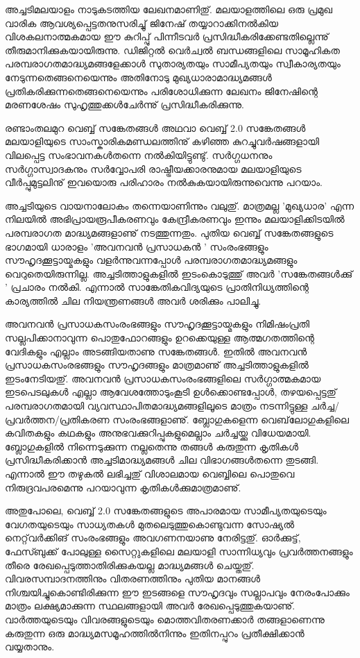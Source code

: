 ﻿
\vskip 2pt

\hspace*{2em}\parbox{8.5cm}{
\small
അച്ചടിമലയാളം നാടുകടത്തിയ ലേഖനമാണിതു്. മലയാളത്തിലെ ഒരു പ്രമുഖ വാരിക ആവശ്യപ്പെട്ടതനുസരിച്ചു് ജിനേഷ് 
തയ്യാറാക്കിനല്‍കിയ വിശകലനാത്മകമായ ഈ കുറിപ്പു് പിന്നീടവര്‍ പ്രസിദ്ധീകരിക്കേണ്ടതില്ലെന്നു് തീരുമാനിക്കുകയായിരുന്നു.
 ഡിജിറ്റല്‍ വെര്‍ച്വല്‍ ബന്ധങ്ങളിലെ സാമൂഹികത പരമ്പരാഗതമാദ്ധ്യമങ്ങളേക്കാള്‍ സുതാര്യതയും സാമീപ്യതയും സ്വീകാര്യതയും 
നേടുന്നതെങ്ങനെയെന്നും അതിനോടു മുഖ്യധാരാമാദ്ധ്യമങ്ങള്‍ പ്രതികരിക്കുന്നതെങ്ങനെയെന്നും പരിശോധിക്കുന്ന ലേഖനം 
ജിനേഷിന്റെ മരണശേഷം സുഹൃത്തുക്കള്‍ചേര്‍ന്നു് പ്രസിദ്ധീകരിക്കുന്നു.
}

\vskip 12pt
\hspace*{-1.5em}രണ്ടാംതലമുറ വെബ്ബ് സങ്കേതങ്ങള്‍ അഥവാ വെബ്ബ് 2.0 സങ്കേതങ്ങള്‍ മലയാളിയുടെ സാംസ്കാരികമണ്ഡലത്തിനു് 
കഴിഞ്ഞ കുറച്ചുവര്‍ഷങ്ങളായി വിലപ്പെട്ട സംഭാവനകള്‍തന്നെ നല്‍കിയിട്ടുണ്ടു്. സര്‍ഗ്ഗധനനും സര്‍ഗ്ഗാസ്വാദകനും സര്‍വ്വോപരി രാഷ്ട്രീയക്കാരനുമായ 
മലയാളിയുടെ വീര്‍പ്പുമുട്ടലിനു് ഇവയൊരു പരിഹാരം നല്‍കുകയായിരുന്നുവെന്നു പറയാം.

അച്ചടിയുടെ വായനാലോകം തന്നെയാണിന്നും വലുതു്. മാത്രമല്ല 'മുഖ്യധാര' എന്ന നിലയില്‍ അഭിപ്രായരൂപീകരണവും 
കേന്ദ്രീകരണവും ഇന്നും മലയാളിക്കിടയില്‍ പരമ്പരാഗത മാദ്ധ്യമങ്ങളാണു് നടത്തുന്നതും. പുതിയ വെബ്ബ് സങ്കേതങ്ങളുടെ ഭാഗമായി
 ധാരാളം 'അവനവന്‍ പ്രസാധകന്‍ ' സംരംഭങ്ങളും സൗഹൃദക്കൂട്ടായ്മകളും വളര്‍ന്നുവന്നപ്പോള്‍ പരമ്പരാഗതമാദ്ധ്യമങ്ങളും 
വെറുതെയിരുന്നില്ല. അച്ചടിത്താളുകളില്‍ ഇടംകൊടുത്തു് അവര്‍ 'സങ്കേതങ്ങള്‍ക്കു് ' പ്രചാരം നല്‍കി. എന്നാല്‍ സാങ്കേതികവിദ്യയുടെ
 പ്രാതിനിധ്യത്തിന്റെ കാര്യത്തില്‍ ചില നിയന്ത്രണങ്ങള്‍ അവര്‍ ശരിക്കും പാലിച്ചു.

അവനവന്‍ പ്രസാധകസംരംഭങ്ങളും സൗഹൃദക്കൂട്ടായ്മകളും നിമിഷംപ്രതി സല്ലപിക്കാനാവുന്ന പൊതുഫോറങ്ങളും ഉറക്കെയുള്ള 
ആത്മഗതത്തിന്റെ വേദികളും എല്ലാം അടങ്ങിയതാണു സങ്കേതങ്ങള്‍. ഇതില്‍ അവനവന്‍ പ്രസാധകസംരഭങ്ങളും സൗഹൃദങ്ങളും
 മാത്രമാണു് അച്ചടിത്താളുകളില്‍ ഇടംനേടിയതു്. അവനവന്‍ പ്രസാധകസംരംഭങ്ങളിലെ സര്‍ഗ്ഗാത്മകമായ ഇടപെടലുകള്‍ എല്ലാ 
ആവേശത്തോടുംകൂടി ഉള്‍ക്കൊണ്ടപ്പോള്‍, തഴയപ്പെട്ടതു് പരമ്പരാഗതമായി വ്യവസ്ഥാപിതമാദ്ധ്യമങ്ങളിലൂടെ മാത്രം നടന്നിട്ടുള്ള 
ചര്‍ച്ച/പ്രവര്‍ത്തന/പ്രതികരണ സംരംഭങ്ങളാണു്. ബ്ലോഗുകളെന്ന വെബ്‌ലോഗുകളിലെ കവിതകളും കഥകളും 
അനുഭവക്കുറിപ്പുകളുമെല്ലാം ചര്‍ച്ചയ്ക്കു വിധേയമായി. ബ്ലോഗുകളില്‍ നിന്നെടുക്കുന്ന നല്ലതെന്നു തങ്ങള്‍ കരുതുന്ന കൃതികള്‍ 
പ്രസിദ്ധീകരിക്കാന്‍ അച്ചടിമാദ്ധ്യമങ്ങള്‍ ചില വിഭാഗങ്ങള്‍തന്നെ തുടങ്ങി. എന്നാല്‍ ഈ തഴുകല്‍ ലഭിച്ചതു് വിശാലമായ വെബ്ബിലെ പൊതുവെ 
നിരുദ്രവപരമെന്നു പറയാവുന്ന കൃതികള്‍ക്കുമാത്രമാണു്.

അതുപോലെ, വെബ്ബ് 2.0 സങ്കേതങ്ങളുടെ അപാരമായ സാമീപ്യതയുടെയും വേഗതയുടെയും സാധ്യതകള്‍ മുതലെടുത്തുകൊണ്ടുവന്ന
 സോഷ്യല്‍ നെറ്റ്‌വര്‍ക്കിങ് സംരംഭങ്ങളും അവഗണനയാണു നേരിട്ടതു്. ഓര്‍ക്കുട്ട്, ഫേസ്ബുക്ക് പോലുള്ള സൈറ്റുകളിലെ മലയാളി
 സാന്നിധ്യവും പ്രവര്‍ത്തനങ്ങളും തീരെ രേഖപ്പെടുത്താതിരിക്കുകയല്ല മാദ്ധ്യമങ്ങള്‍ ചെയ്തതു്. വിവരസമ്പാദനത്തിനും 
വിതരണത്തിനും പുതിയ മാനങ്ങള്‍ നിശ്ചയിച്ചുകൊണ്ടിരിക്കുന്ന ഈ ഇടങ്ങളെ സൗഹൃദവും സല്ലാപവും നേരംപോക്കും മാത്രം 
ലക്ഷ്യമാക്കുന്ന സ്ഥലങ്ങളായി അവര്‍ രേഖപ്പെടുത്തുകയാണു്. വാര്‍ത്തയുടെയും വിവരങ്ങളുടെയും മൊത്തവിതരണക്കാര്‍ തങ്ങളാണെന്നു
 കരുതുന്ന ഒരു മാദ്ധ്യമസമൂഹത്തില്‍നിന്നും ഇതിനപ്പുറം പ്രതീക്ഷിക്കാന്‍ വയ്യതാനും.

